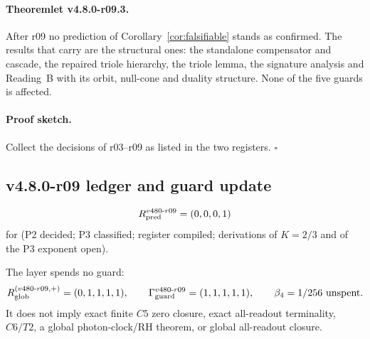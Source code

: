 \paragraph{Theoremlet v4.8.0-r09.3.}
After r09 no prediction of Corollary~\ref{cor:falsifiable} stands as confirmed.  The results that carry
are the structural ones: the standalone compensator and cascade, the repaired triole hierarchy, the
triole lemma, the signature analysis and Reading~B with its orbit, null-cone and duality structure.
None of the five guards is affected.

\paragraph{Proof sketch.}
Collect the decisions of r03--r09 as listed in the two registers.  \(\square\)

\subsection*{v4.8.0-r09 ledger and guard update}
\label{subsec:v480-r09-ledger-guard}

\[
R_{\rm pred}^{v480\text{-}r09}=(0,0,0,1)
\]
for (P2 decided; P3 classified; register compiled; derivations of \(K=2/3\) and of the P3 exponent open).

The layer spends no guard:
\[
R_{\rm glob}^{(v480\text{-}r09,+)}=(0,1,1,1,1),
\qquad
\Gamma_{\rm guard}^{v480\text{-}r09}=(1,1,1,1,1),
\qquad
\beta_4=1/256\ \text{unspent}.
\]
It does not imply exact finite \(C5\) zero closure, exact all-readout terminality,
\(C6/T2\), a global photon-clock/RH theorem, or global all-readout closure.

